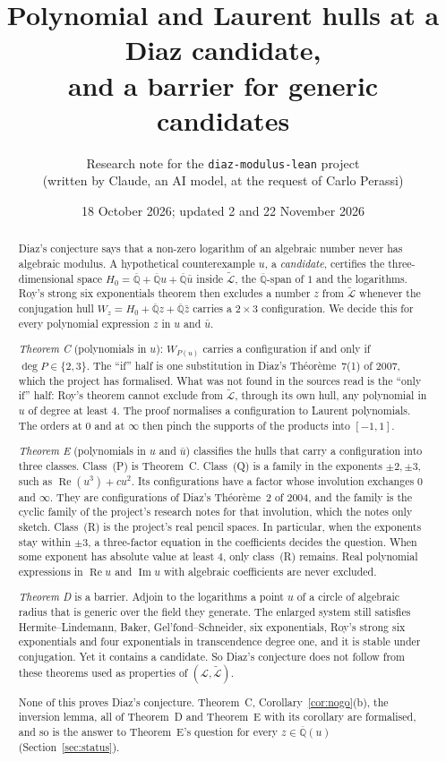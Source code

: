 \documentclass[11pt,a4paper]{article}
\title{Polynomial and Laurent hulls at a Diaz candidate,\\
and a barrier for generic candidates}
\author{Research note for the \texttt{diaz-modulus-lean} project\\
(written by Claude, an AI model, at the request of Carlo Perassi)}
\date{18 October 2026; updated 2 and 22 November 2026}
\theoremstyle{plain}
\theoremstyle{definition}
\newcommand{\Qbar}{\overline{\mathbb{Q}}}
\newcommand{\cL}{\mathcal{L}}
\newcommand{\Lt}{\widetilde{\mathcal{L}}}
\renewcommand{\Re}{\operatorname{Re}}
\renewcommand{\Im}{\operatorname{Im}}
\begin{document}
\maketitle

\begin{abstract}
Diaz's conjecture says that a non-zero logarithm of an algebraic number never has
algebraic modulus. A hypothetical counterexample $u$, a \emph{candidate}, certifies
the three-dimensional space $H_{0}=\Qbar+\Qbar u+\Qbar\bar u$ inside $\Lt$, the
$\Qbar$-span of $1$ and the logarithms. Roy's strong six exponentials theorem then
excludes a number $z$ from $\Lt$ whenever the conjugation hull
$W_{z}=H_{0}+\Qbar z+\Qbar\bar z$ carries a $2\times3$ configuration. We decide this for
every polynomial expression $z$ in $u$ and $\bar u$.

\emph{Theorem C} (polynomials in $u$): $W_{P(u)}$ carries a configuration if and only if
$\deg P\in\{2,3\}$. The ``if'' half is one substitution in Diaz's Th\'eor\`eme~7(1) of
2007, which the project has formalised. What was not found in the sources read is the ``only if'' half: Roy's
theorem cannot exclude from $\Lt$, through its own hull, any polynomial in $u$ of
degree at least $4$. The proof normalises a configuration to Laurent polynomials. The
orders at $0$ and at $\infty$ then pinch the supports of the products into $[-1,1]$.

\emph{Theorem E} (polynomials in $u$ and $\bar u$) classifies the hulls that carry a
configuration into three classes. Class~(P) is Theorem~C. Class~(Q) is a family in the
exponents $\pm2,\pm3$, such as $\Re(u^{3})+cu^{2}$. Its configurations have a factor
whose involution exchanges $0$ and $\infty$. They are configurations of Diaz's
Th\'eor\`eme~2 of 2004, and the family is the cyclic family of the project's research notes
for that involution, which the notes only sketch. Class~(R) is the project's real pencil spaces. In particular, when the
exponents stay within $\pm3$, a three-factor equation in the coefficients decides the
question. When some exponent has absolute value at least $4$, only class~(R) remains.
Real polynomial expressions in $\Re u$ and $\Im u$ with algebraic coefficients are
never excluded.

\emph{Theorem D} is a barrier. Adjoin to the logarithms a point $u$ of a circle of
algebraic radius that is generic over the field they generate. The enlarged system
still satisfies Hermite--Lindemann, Baker, Gel'fond--Schneider, six exponentials,
Roy's strong six exponentials and four exponentials in transcendence degree one, and
it is stable under conjugation. Yet it contains a candidate. So Diaz's conjecture does
not follow from these theorems used as properties of $(\cL,\Lt)$.

None of this proves Diaz's conjecture. Theorem~C, Corollary~\ref{cor:nogo}(b), the inversion lemma,
all of Theorem~D and Theorem~E with its corollary are formalised, and so is the answer to Theorem~E's question for
every $z\in\Qbar(u)$ (Section~\ref{sec:status}).
\end{abstract}
\end{document}
